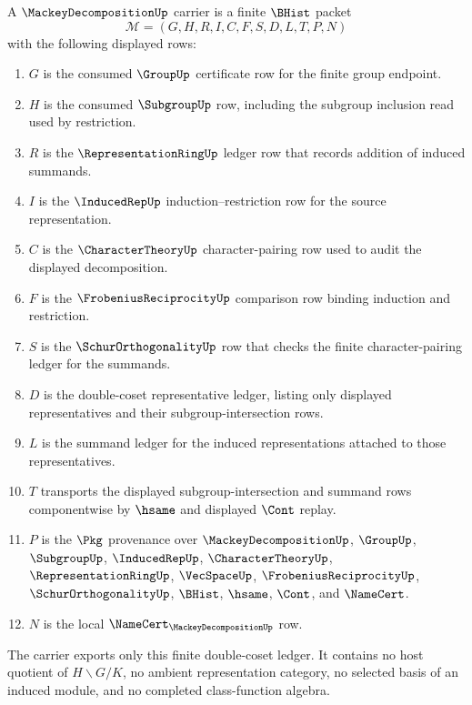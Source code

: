 \begin{definition}
\label{def:mackey-decomposition-carrier}
A $\MackeyDecompositionUp$ carrier is a finite $\BHist$ packet
$$
\mathcal{M}=(G,H,R,I,C,F,S,D,L,T,P,N)
$$
with the following displayed rows:
\begin{enumerate}
\item $G$ is the consumed $\GroupUp$ certificate row for the finite group endpoint.
\item $H$ is the consumed $\SubgroupUp$ row, including the subgroup inclusion read used by restriction.
\item $R$ is the $\RepresentationRingUp$ ledger row that records addition of induced summands.
\item $I$ is the $\InducedRepUp$ induction--restriction row for the source representation.
\item $C$ is the $\CharacterTheoryUp$ character-pairing row used to audit the displayed decomposition.
\item $F$ is the $\FrobeniusReciprocityUp$ comparison row binding induction and restriction.
\item $S$ is the $\SchurOrthogonalityUp$ row that checks the finite character-pairing ledger for the summands.
\item $D$ is the double-coset representative ledger, listing only displayed representatives and their subgroup-intersection rows.
\item $L$ is the summand ledger for the induced representations attached to those representatives.
\item $T$ transports the displayed subgroup-intersection and summand rows componentwise by $\hsame$ and displayed $\Cont$ replay.
\item $P$ is the $\Pkg$ provenance over $\MackeyDecompositionUp$, $\GroupUp$, $\SubgroupUp$, $\InducedRepUp$, $\CharacterTheoryUp$, $\RepresentationRingUp$, $\VecSpaceUp$, $\FrobeniusReciprocityUp$, $\SchurOrthogonalityUp$, $\BHist$, $\hsame$, $\Cont$, and $\NameCert$.
\item $N$ is the local $\NameCert_{\MackeyDecompositionUp}$ row.
\end{enumerate}
The carrier exports only this finite double-coset ledger. It contains no host quotient of $H\backslash G/K$, no ambient representation category, no selected basis of an induced module, and no completed class-function algebra.
\end{definition}

